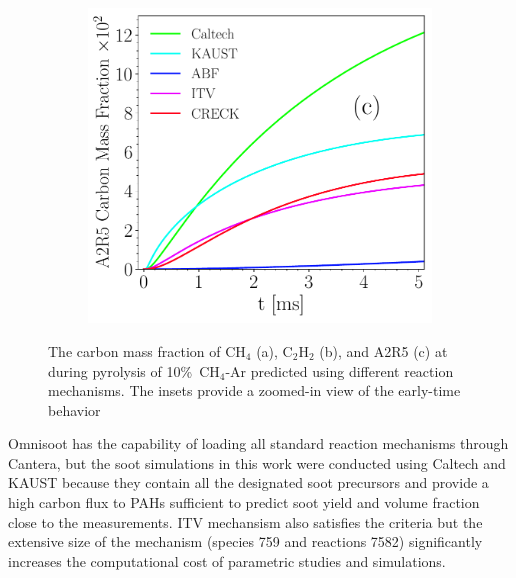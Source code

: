 \begin{figure}[H]
\begin{subfigure}[t]{0.31\textwidth}
	\end{subfigure}
	\begin{subfigure}[t]{0.31\textwidth}
		\includegraphics[width=1\textwidth]{Figures/Results/chemistry/A2R5.pdf}
	\end{subfigure}
	\caption{The carbon mass fraction of $\mathrm{CH_4}$ (a), $\mathrm{C_2H_2}$ (b), and A2R5 (c) at during pyrolysis of 10\%~$\mathrm{CH_4}$-Ar predicted using different reaction mechanisms. The insets provide a zoomed-in view of the early-time behavior}
	\label{fig:CH4_C2H4_A2R5_chem} 
\end{figure}

Omnisoot has the capability of loading all standard reaction mechanisms through Cantera, but the soot simulations in this work were conducted using Caltech and KAUST because they contain all the designated soot precursors and provide a high carbon flux to PAHs sufficient to predict soot yield and volume fraction close to the measurements. ITV mechansism also satisfies the criteria but the extensive size of the mechanism (species 759 and reactions 7582) significantly increases the computational cost of parametric studies and simulations.

%
